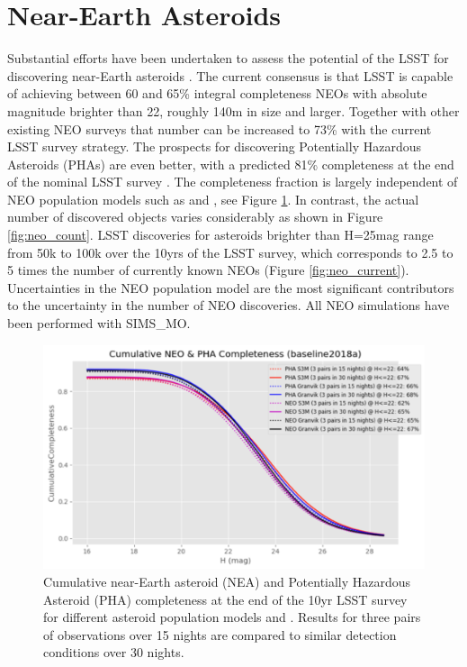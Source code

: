 \section{Near-Earth Asteroids}\label{sec:neo}
Substantial efforts have been undertaken to assess the potential of the \gls{LSST} for discovering near-Earth asteroids \citep[e.g.][]{ivezic2006lsst,jones2015asteroid,grav2016modeling,veres2017near,veres2017high,jones2018large,ivezic2019lsst}. The current consensus is that \gls{LSST} is capable of achieving between 60 and 65\% integral completeness NEOs with absolute magnitude brighter than 22, roughly 140m in size and larger. Together with other existing \gls{NEO} surveys that number can be increased to 73\% with the current \gls{LSST} survey strategy. The prospects for discovering Potentially Hazardous Asteroids (PHAs) are even better, with a predicted 81\% completeness at the end of the nominal \gls{LSST} survey \citep{ivezic2019lsst}. The completeness fraction is largely independent of \gls{NEO} population models such as \citep[S3M,][]{s3m} and \citet{granvik2018neos}, see Figure \ref{fig:neo_compl}. In contrast, the actual number of discovered objects varies considerably as shown in Figure \ref{fig:neo_count}. \gls{LSST} discoveries for asteroids brighter than H=25mag range from 50k to 100k over the 10yrs of the \gls{LSST} survey, which corresponds to 2.5 to 5 times the number of currently known NEOs (Figure \ref{fig:neo_current}).
Uncertainties in the \gls{NEO} population model are the most significant contributors to the uncertainty in the number of \gls{NEO} discoveries. All \gls{NEO} simulations have been performed with SIMS\_MO.
\begin{figure}[tb!]
\begin{center}
\includegraphics[width=0.65\linewidth]{figs/neo2.png}
\end{center}
\caption{Cumulative near-Earth asteroid (NEA) and Potentially Hazardous Asteroid (\gls{PHA}) completeness at the end of the 10yr \gls{LSST} survey for different asteroid population models \citep[S3M,][]{s3m} and \citet{granvik2018neos}. Results for three pairs of observations over 15 nights are compared to similar detection conditions over 30 nights.}
\label{fig:neo_compl}       %
\end{figure}

